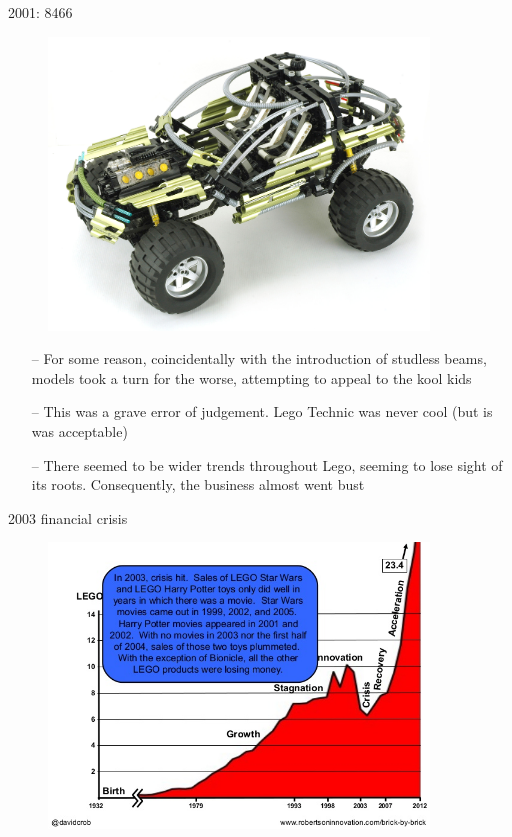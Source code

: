 \documentclass[xcolor=dvipsnames]{beamer}
\begin{document}
\begin{frame}[fragile]{2001: 8466}
\begin{figure}[H]
 \centering
 \includegraphics[width=0.9\textwidth]{2001_8466_truck.jpg}
\end{figure}
\end{frame}

\begin{frame}[fragile]{}
\begin{itemize}
\item[--] For some reason, coincidentally with the introduction of studless beams, models took a turn for the worse, attempting to appeal to the kool kids  \vspace{3mm}
\item[--] This was a grave error of judgement. Lego Technic was never cool (but is was acceptable) \vspace{3mm}
\item[--] There seemed to be wider trends throughout Lego, seeming to lose sight of its roots. Consequently, the business almost went bust \vspace{3mm}
\end{itemize}
\end{frame}

\begin{frame}[fragile]{2003 financial crisis}
\begin{figure}[H]
 \centering
 \includegraphics[width=0.9\textwidth]{2003_lego_sales_2003.jpg}
\end{figure}
\end{frame}
\end{document}

